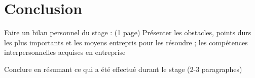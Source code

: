 
\section{Conclusion}


Faire un bilan personnel du stage : (1 page)
Présenter les obstacles, points durs les plus importants et les moyens entrepris pour les
résoudre ; les compétences interpersonnelles acquises en entreprise
 
  
   
Conclure en résumant ce qui a été effectué durant le stage (2-3 paragraphes)
    



